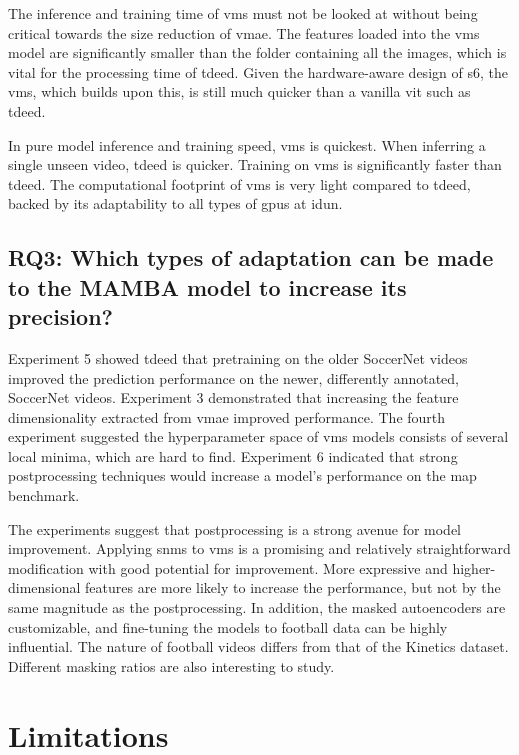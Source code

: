 The inference and training time of \acrshort{vms} must not be looked at without being critical towards the size reduction of \acrshort{vmae}. The features loaded into the \acrshort{vms} model are significantly smaller than the folder containing all the images, which is vital for the processing time of \acrshort{tdeed}. Given the hardware-aware design of \acrfull{s6}, the \acrshort{vms}, which builds upon this, is still much quicker than a vanilla \acrfull{vit} such as \acrshort{tdeed}.

In pure model inference and training speed, \acrshort{vms} is quickest. When inferring a single unseen video, \acrshort{tdeed} is quicker. Training on \acrshort{vms} is significantly faster than \acrshort{tdeed}. The computational footprint of \acrshort{vms} is very light compared to \acrshort{tdeed}, backed by its adaptability to all types of \acrshort{gpu}s at \acrshort{idun}. 

\subsection{RQ3: Which types of adaptation can be made to the MAMBA model to increase its precision?}

Experiment 5 showed \acrshort{tdeed} that pretraining on the older SoccerNet videos improved the prediction performance on the newer, differently annotated, SoccerNet videos. Experiment 3 demonstrated that increasing the feature dimensionality extracted from \acrshort{vmae} improved performance. The fourth experiment suggested the hyperparameter space of \acrshort{vms} models consists of several local minima, which are hard to find. Experiment 6 indicated that strong postprocessing techniques would increase a model's performance on the \acrshort{map} benchmark. 

The experiments suggest that postprocessing is a strong avenue for model improvement. Applying \acrfull{snms} to \acrshort{vms} is a promising and relatively straightforward modification with good potential for improvement. More expressive and higher-dimensional features are more likely to increase the performance, but not by the same magnitude as the postprocessing. In addition, the masked autoencoders are customizable, and fine-tuning the models to football data can be highly influential. The nature of football videos differs from that of the Kinetics dataset. Different masking ratios are also interesting to study. 

\section{Limitations}

